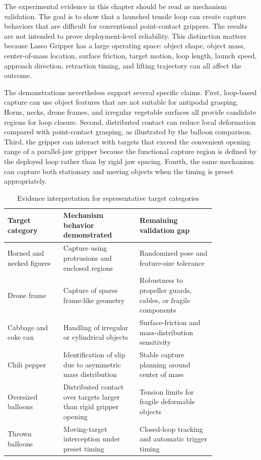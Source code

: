 The experimental evidence in this chapter should be read as mechanism validation. The goal is to show that a launched tensile loop can create capture behaviors that are difficult for conventional point-contact grippers. The results are not intended to prove deployment-level reliability. This distinction matters because Lasso Gripper has a large operating space: object shape, object mass, center-of-mass location, surface friction, target motion, loop length, launch speed, approach direction, retraction timing, and lifting trajectory can all affect the outcome.

The demonstrations nevertheless support several specific claims. First, loop-based capture can use object features that are not suitable for antipodal grasping. Horns, necks, drone frames, and irregular vegetable surfaces all provide candidate regions for loop closure. Second, distributed contact can reduce local deformation compared with point-contact grasping, as illustrated by the balloon comparison. Third, the gripper can interact with targets that exceed the convenient opening range of a parallel-jaw gripper because the functional capture region is defined by the deployed loop rather than by rigid jaw spacing. Fourth, the same mechanism can capture both stationary and moving objects when the timing is preset appropriately.

\begin{table}[htbp]
    \centering
    \caption{Evidence interpretation for representative target categories}
    \label{tab:lasso_evidence_interpretation}
    \begin{tabular}{p{0.22\linewidth} p{0.30\linewidth} p{0.30\linewidth}}
        \toprule
        Target category & Mechanism behavior demonstrated & Remaining validation gap \\
        \midrule
        Horned and necked figures & Capture using protrusions and enclosed regions & Randomized pose and feature-size tolerance \\
        Drone frame & Capture of sparse frame-like geometry & Robustness to propeller guards, cables, or fragile components \\
        Cabbage and coke can & Handling of irregular or cylindrical objects & Surface-friction and mass-distribution sensitivity \\
        Chili pepper & Identification of slip due to asymmetric mass distribution & Stable capture planning around center of mass \\
        Oversized balloons & Distributed contact over targets larger than rigid gripper opening & Tension limits for fragile deformable objects \\
        Thrown balloons & Moving-target interception under preset timing & Closed-loop tracking and automatic trigger timing \\
        \bottomrule
    \end{tabular}
\end{table}

